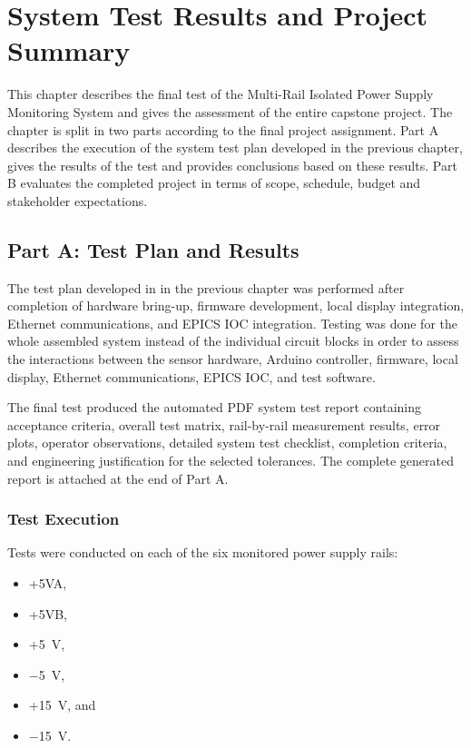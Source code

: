 \chapter{System Test Results and Project Summary}
\label{chap:test-results}

This chapter describes the final test of the Multi-Rail Isolated Power Supply Monitoring System and gives the assessment of the entire capstone project. The chapter is split in two parts according to the final project assignment. Part A describes the execution of the system test plan developed in the previous chapter, gives the results of the test and provides conclusions based on these results. Part B evaluates the completed project in terms of scope, schedule, budget and stakeholder expectations.

\section{Part A: Test Plan and Results}
\label{sec:part-a-test-results}

The test plan developed in in the previous chapter was performed after completion of hardware bring-up, firmware development, local display integration, Ethernet communications, and EPICS IOC integration. Testing was done for the whole assembled system instead of the individual circuit blocks in order to assess the interactions between the sensor hardware, Arduino controller, firmware, local display, Ethernet communications, EPICS IOC, and test software.

The final test produced the automated PDF system test report containing acceptance criteria, overall test matrix, rail-by-rail measurement results, error plots, operator observations, detailed system test checklist, completion criteria, and engineering justification for the selected tolerances. The complete generated report is attached at the end of Part A.

\subsection{Test Execution}

Tests were conducted on each of the six monitored power supply rails:

\begin{itemize}
	\item +5VA,
	\item +5VB,
	\item +5~V,
	\item $-$5~V,
	\item +15~V, and
	\item $-$15~V.
\end{itemize}

